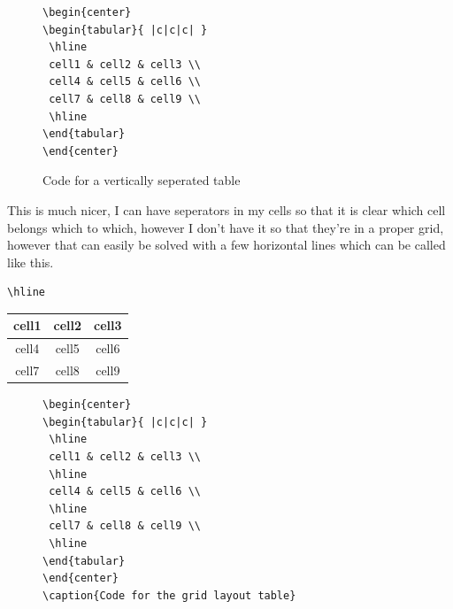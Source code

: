 \documentclass[12pt, letterpaper, oneside]{article} \usepackage[utf8]{inputenc}
\begin{document}
\begin{figure}[H]
	\centering
	\begin{lstlisting}
\begin{center}
\begin{tabular}{ |c|c|c| } 
 \hline
 cell1 & cell2 & cell3 \\ 
 cell4 & cell5 & cell6 \\ 
 cell7 & cell8 & cell9 \\ 
 \hline
\end{tabular}
\end{center}
	\end{lstlisting}
	\caption{Code for a vertically seperated table}
\end{figure}

This is much nicer, I can have seperators in my cells so that it is clear which cell belongs which to which, however I don't have it so that they're in a proper grid, however that can easily be solved with a few horizontal lines which can be called like this. 
\begin{lstlisting}
\hline
\end{lstlisting}

\begin{center}
\begin{tabular}{ |c|c|c| } 
 \hline
 cell1 & cell2 & cell3 \\ 
 \hline 
 cell4 & cell5 & cell6 \\ 
 \hline 
 cell7 & cell8 & cell9 \\ 
 \hline
\end{tabular}
\end{center}

\begin{figure}[H]
\begin{lstlisting}	
\begin{center}
\begin{tabular}{ |c|c|c| } 
 \hline
 cell1 & cell2 & cell3 \\ 
 \hline 
 cell4 & cell5 & cell6 \\ 
 \hline 
 cell7 & cell8 & cell9 \\ 
 \hline
\end{tabular}
\end{center}
\caption{Code for the grid layout table}
\end{lstlisting}
\end{figure}
\end{document}
